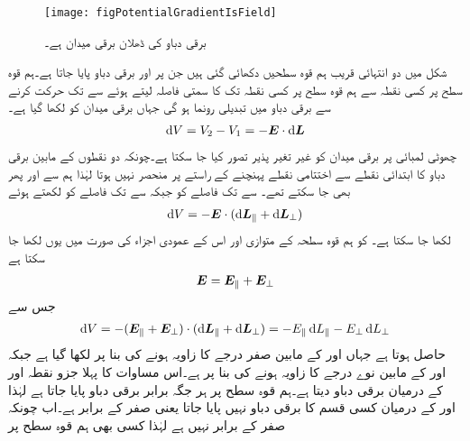 \begin{figure}
\centering
\texttt{[image: figPotentialGradientIsField]}
\caption{برقی دباو کی ڈھلان برقی میدان ہے۔}
\label{شکل_توانائی_دباو_ڈھلان_میدان_ہے}
\end{figure}

شکل  میں دو انتہائی قریب  ہم قوہ  سطحیں دکھائی گئی ہیں جن پر  اور  برقی دباو پایا جاتا ہے۔ہم قوہ سطح  پر کسی نقطہ   سے ہم قوہ سطح  پر کسی نقطہ  تک  کا سمتی فاصلہ  لیتے ہوئے  سے   تک حرکت کرنے سے برقی دباو میں   تبدیلی رونما ہو گی جہاں برقی میدان کو  لکھا گیا ہے۔
\begin{align}\label{مساوات_توانائی_ہم_قوہ_سطح_اور_میدان}
\dif V=V_2-V_1=-\kvec{E} \cdot \dif \kvec{L}
\end{align}
چھوٹی لمبائی  پر برقی میدان کو غیر تغیر پذیر تصور کیا جا سکتا ہے۔چونکہ  دو نقطوں کے مابین برقی دباو کا ابتدائی نقطے سے اختتامی نقطے پہنچنے کے راستے پر منحصر نہیں ہوتا لہٰذا ہم  سے  اور پھر  بھی جا سکتے تھے۔ سے  تک فاصلے کو   جبکہ  سے  تک فاصلے کو   لکھتے ہوئے
\begin{align}
\dif V=-\kvec{E} \cdot (\dif \kvec{L}_\parallel+ \dif \kvec{L}_\perp)
\end{align}
لکھا جا سکتا ہے۔ کو  ہم قوہ سطحہ کے متوازی  اور اس کے عمودی اجزاء کی صورت میں یوں لکھا جا سکتا ہے
\begin{align}
{\ensuremath{{\boldsymbol{E}}}}={{\boldsymbol{E}}}_\parallel+{{\boldsymbol{E}}}_\perp
\end{align}  
جس سے
\begin{align}
\dif V=-(\kvec{E}_\parallel+\kvec{E}_\perp) \cdot (\dif \kvec{L}_\parallel+ \dif \kvec{L}_\perp)=-{E}_\parallel \dif L_\parallel-E_\perp \dif L_\perp
\end{align}  
حاصل ہوتا ہے جہاں  اور  کے مابین صفر درجے کا زاویہ ہونے کی بنا پر 
  لکھا گیا ہے جبکہ  اور
  کے مابین نوے درجے کا زاویہ ہونے کی بنا پر  ہے۔اس مساوات کا پہلا جزو  نقطہ  اور  کے درمیان برقی دباو دیتا ہے۔ہم قوہ سطح پر ہر جگہ برابر برقی دباو پایا جاتا ہے لہٰذا  اور  کے درمیان کسی قسم کا برقی دباو نہیں پایا جاتا یعنی  صفر کے برابر ہے۔اب چونکہ  صفر کے برابر نہیں ہے لہٰذا کسی بھی ہم قوہ سطح پر
